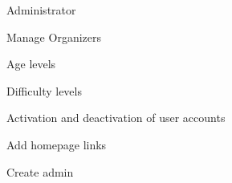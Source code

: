 
\begin{section}{Administrator}

    \begin{subsection}{Manage Organizers}
    
    
    
    
    
    \end{subsection}
    
    \begin{subsection}{Age levels}
    
    
    \end{subsection}
    
    \begin{subsection}{Difficulty levels}
    
    
    \end{subsection}
    
    \begin{subsection}{Activation and deactivation of user accounts}
    
    \end{subsection}
    
    \begin{subsection}{Add homepage links}
    
    \end{subsection}
		
		\begin{subsection}{Create admin}
		
		\end{subsection}

\end{section}


